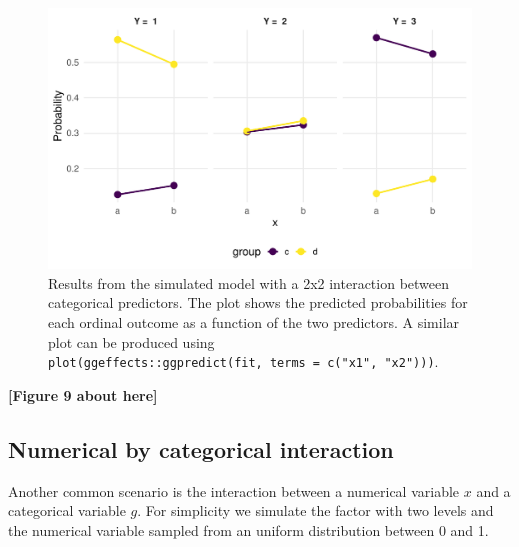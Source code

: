 \documentclass[
  man, mask,floatsintext]{apa6}
\begin{document}
\scriptsize

\begin{figure}

{\centering \includegraphics[width=1\linewidth]{paper_files/figure-latex/fig-effects-2-by-2-interaction-1} 

}

\caption{Results from the simulated model with a 2x2 interaction between categorical predictors. The plot shows the predicted probabilities for each ordinal outcome as a function of the two predictors. A similar plot can be produced using \texttt{plot(ggeffects::ggpredict(fit,\ terms\ =\ c("x1",\ "x2")))}.}\label{fig:fig-effects-2-by-2-interaction}
\end{figure}

\begin{center}\textbf{[Figure 9 about here]} \end{center}

\normalsize

\subsection{Numerical by categorical interaction}\label{numerical-by-categorical-interaction}

Another common scenario is the interaction between a numerical variable \(x\) and a categorical variable \(g\). For simplicity we simulate the factor with two levels and the numerical variable sampled from an uniform distribution between 0 and 1.

\scriptsize
\end{document}
